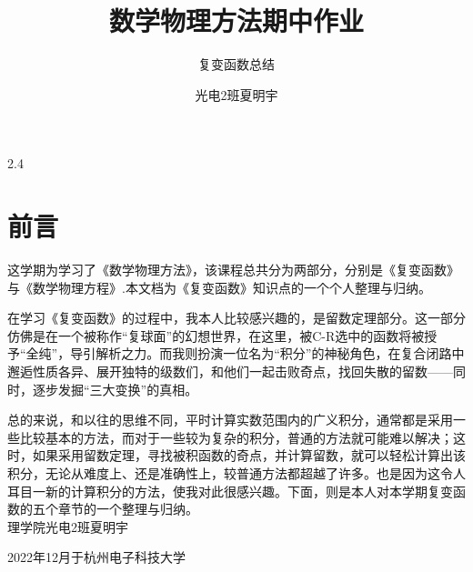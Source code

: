 \documentclass[lang=cn,10pt]{elegantbook}
\author{光电2班\quad 夏明宇\quad 21201128}
\title{数学物理方法期中作业}
\subtitle{复变函数总结}
\date{\zhtoday}
\institute{杭州电子科技大学\quad 理学院}
\begin{document}
\maketitle
\frontmatter
\mainmatter
\newpage
\begin{spacing}{2.4}
\chapter*{前言}
这学期为学习了《数学物理方法》，该课程总共分为两部分，分别是《复变函数》与《数学物理方程》.本文档为《复变函数》知识点的一个个人整理与归纳。


在学习《复变函数》的过程中，我本人比较感兴趣的，是留数定理部分。这一部分仿佛是在一个被称作“复球面”的幻想世界，在这里，被C-R选中的函数将被授予“全纯”，导引解析之力。而我则扮演一位名为“积分”的神秘角色，在复合闭路中邂逅性质各异、展开独特的级数们，和他们一起击败奇点，找回失散的留数——同时，逐步发掘“三大变换”的真相。


总的来说，和以往的思维不同，平时计算实数范围内的广义积分，通常都是采用一些比较基本的方法，而对于一些较为复杂的积分，普通的方法就可能难以解决；这时，如果采用留数定理，寻找被积函数的奇点，并计算留数，就可以轻松计算出该积分，无论从难度上、还是准确性上，较普通方法都超越了许多。也是因为这令人耳目一新的计算积分的方法，使我对此很感兴趣。下面，则是本人对本学期复变函数的五个章节的一个整理与归纳。\\
\vfill
\hfill 理学院光电2班夏明宇


\hfill 2022年12月于杭州电子科技大学
\end{spacing}
\end{document}
